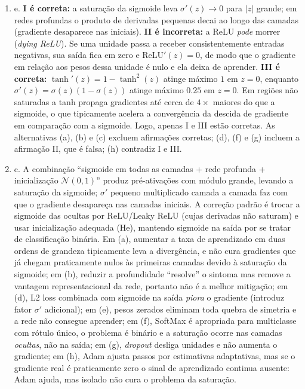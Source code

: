 \documentclass{dlproblemset}
\begin{document}
\begin{enumerate}[1)]
    \item e. \textbf{I é correta:} a saturação da sigmoide leva $\sigma'(z) \to 0$ para $|z|$ grande; em redes profundas o produto de derivadas pequenas decai ao longo das camadas (gradiente desaparece nas iniciais). \textbf{II é incorreta:} a ReLU \textit{pode} morrer (\textit{dying ReLU}). Se uma unidade passa a receber consistentemente entradas negativas, sua saída fica em zero e $\mathrm{ReLU}'(z) = 0$, de modo que o gradiente em relação aos pesos dessa unidade é nulo e ela deixa de aprender. \textbf{III é correta:} $\tanh'(z) = 1 - \tanh^2(z)$ atinge máximo $1$ em $z = 0$, enquanto $\sigma'(z) = \sigma(z)(1 - \sigma(z))$ atinge máximo $0.25$ em $z = 0$. Em regiões não saturadas a tanh propaga gradientes até cerca de $4\times$ maiores do que a sigmoide, o que tipicamente acelera a convergência da descida de gradiente em comparação com a sigmoide. Logo, apenas I e III estão corretas. As alternativas (a), (b) e (c) excluem afirmações corretas; (d), (f) e (g) incluem a afirmação II, que é falsa; (h) contradiz I e III.

    \item c. A combinação ``sigmoide em todas as camadas + rede profunda + inicialização $\mathcal{N}(0, 1)$'' produz pré-ativações com módulo grande, levando a saturação da sigmoide; $\sigma'$ pequeno multiplicado camada a camada faz com que o gradiente desapareça nas camadas iniciais. A correção padrão é trocar a sigmoide das ocultas por ReLU/Leaky ReLU (cujas derivadas não saturam) e usar inicialização adequada (He), mantendo sigmoide na saída por se tratar de classificação binária. Em (a), aumentar a taxa de aprendizado em duas ordens de grandeza tipicamente leva a divergência, e não cura gradientes que já chegam praticamente nulos às primeiras camadas devido à saturação da sigmoide; em (b), reduzir a profundidade ``resolve'' o sintoma mas remove a vantagem representacional da rede, portanto não é a melhor mitigação; em (d), L2 loss combinada com sigmoide na saída \emph{piora} o gradiente (introduz fator $\sigma'$ adicional); em (e), pesos zerados eliminam toda quebra de simetria e a rede não consegue aprender; em (f), SoftMax é apropriada para multiclasse com rótulo único, o problema é binário e a saturação ocorre nas camadas \emph{ocultas}, não na saída; em (g), \textit{dropout} desliga unidades e não aumenta o gradiente; em (h), Adam ajusta passos por estimativas adaptativas, mas se o gradiente real é praticamente zero o sinal de aprendizado continua ausente: Adam ajuda, mas isolado não cura o problema da saturação.


\end{enumerate}
\end{document}

